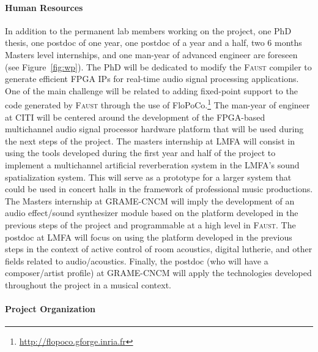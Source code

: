 \documentclass[a4paper,10pt]{article}
\newcommand{\F}{\textsc{Faust}}
\begin{document}
\paragraph{Human Resources}

In addition to the permanent lab members working on the project, one PhD thesis, one postdoc of one year, one postdoc of a year and a half, two 6 months Masters level internships, and one man-year of advanced engineer are foreseen (see Figure~\ref{fig:wp}). The PhD will be dedicated to modify the \F{} compiler to generate efficient FPGA IPs for real-time audio signal processing applications. One of the main challenge will be related to adding fixed-point support to the code generated by \F{} through the use of FloPoCo.\footnote{\url{http://flopoco.gforge.inria.fr}} The man-year of engineer at CITI will be centered around the development of the FPGA-based multichannel audio signal processor hardware platform that will be used during the next steps of the project. The masters internship at LMFA will consist in using the tools developed during the first year and half of the project to implement a multichannel artificial reverberation system in the LMFA's sound spatialization system. This will serve as a prototype for a larger system that could be used in concert halls in the framework of professional music productions. The Masters internship at GRAME-CNCM will imply the development of an audio effect/sound synthesizer module based on the platform developed in the previous steps of the project and programmable at a high level in \F{}. The postdoc at LMFA will focus on using the platform developed in the previous steps in the context of active control of room acoustics, digital lutherie, and other fields related to audio/acoustics. Finally, the postdoc (who will have a composer/artist profile) at GRAME-CNCM will apply the technologies developed throughout the project in a musical context.

\paragraph{Project Organization}

\end{document}
